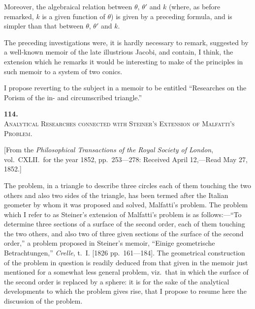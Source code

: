 \documentclass[11pt]{article}
\begin{document}
Moreover, the algebraical relation between $\theta$, $\theta'$ and $k$ (where, as before remarked, $k$ is a given function of $\theta$) is given by a preceding formula, and is simpler than that between $\theta$, $\theta'$ and $k$.

The preceding investigations were, it is hardly necessary to remark, suggested by a well-known memoir of the late illustrious Jacobi, and contain, I think, the extension which he remarks it would be interesting to make of the principles in such memoir to a system of two conics.

I propose reverting to the subject in a memoir to be entitled ``Researches on the Porism of the in- and circumscribed triangle.''

\begin{flushright}
\end{flushright}


\newpage
\setcounter{page}{57}

\begin{center}
{\Large\bfseries 114.}\\[0.5em]
{\large\scshape Analytical Researches connected with Steiner's Extension of Malfatti's Problem.}
\end{center}
\vspace{0.3em}
\begin{center}
\small [From the \textit{Philosophical Transactions of the Royal Society of London}, vol.~CXLII.\ for the year 1852, pp.~253---278: Received April 12,---Read May 27, 1852.]
\end{center}
\vspace{0.5em}

The problem, in a triangle to describe three circles each of them touching the two others and also two sides of the triangle, has been termed after the Italian geometer by whom it was proposed and solved, Malfatti's problem. The problem which I refer to as Steiner's extension of Malfatti's problem is as follows:---``To determine three sections of a surface of the second order, each of them touching the two others, and also two of three given sections of the surface of the second order,'' a problem proposed in Steiner's memoir, ``Einige geometrische Betrachtungen,'' \textit{Crelle}, t.~I. [1826 pp.~161---184]. The geometrical construction of the problem in question is readily deduced from that given in the memoir just mentioned for a somewhat less general problem, viz.\ that in which the surface of the second order is replaced by a sphere: it is for the sake of the analytical developments to which the problem gives rise, that I propose to resume here the discussion of the problem.
\end{document}
